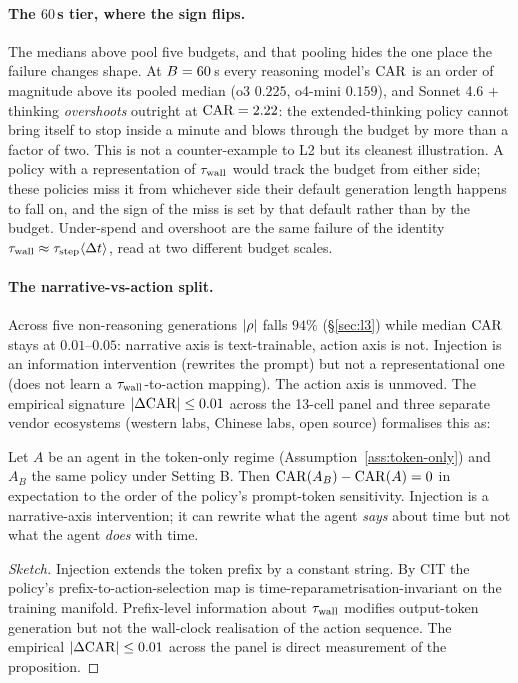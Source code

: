 \paragraph{The $60$\,s tier, where the sign flips.} The medians above pool five budgets, and that pooling hides the one place the failure changes shape. At $B = 60$\,s every reasoning model's $\mathrm{CAR}$ is an order of magnitude above its pooled median (o3 $0.225$, o4-mini $0.159$), and Sonnet 4.6 $+$ thinking \emph{overshoots} outright at $\mathrm{CAR} = 2.22$: the extended-thinking policy cannot bring itself to stop inside a minute and blows through the budget by more than a factor of two. This is not a counter-example to L2 but its cleanest illustration. A policy with a representation of $\tau_{\mathrm{wall}}$ would track the budget from either side; these policies miss it from whichever side their default generation length happens to fall on, and the sign of the miss is set by that default rather than by the budget. Under-spend and overshoot are the same failure of the identity $\tau_{\mathrm{wall}} \approx \tau_{\mathrm{step}}\langle\Delta t\rangle$, read at two different budget scales.

\paragraph{The narrative-vs-action split.}
Across five non-reasoning generations $|\rho|$ falls $94\%$ (\S\ref{sec:l3}) while median $\mathrm{CAR}$ stays at $0.01$--$0.05$: narrative axis is text-trainable, action axis is not. Injection is an information intervention (rewrites the prompt) but not a representational one (does not learn a $\tau_{\mathrm{wall}}$-to-action mapping). The action axis is unmoved. The empirical signature $|\Delta\mathrm{CAR}| \leq 0.01$ across the 13-cell panel and three separate vendor ecosystems (western labs, Chinese labs, open source) formalises this as:

\begin{proposition}
\label{prop:injection-not-action}
Let $A$ be an agent in the token-only regime (Assumption~\ref{ass:token-only}) and $A_B$ the same policy under Setting B. Then $\mathrm{CAR}(A_B) - \mathrm{CAR}(A) = 0$ in expectation to the order of the policy's prompt-token sensitivity. Injection is a narrative-axis intervention; it can rewrite what the agent \emph{says} about time but not what the agent \emph{does} with time.
\end{proposition}

\begin{proof}[Sketch] Injection extends the token prefix by a constant string. By CIT the policy's prefix-to-action-selection map is time-reparametrisation-invariant on the training manifold. Prefix-level information about $\tau_{\mathrm{wall}}$ modifies output-token generation but not the wall-clock realisation of the action sequence. The empirical $|\Delta\mathrm{CAR}| \leq 0.01$ across the panel is direct measurement of the proposition. \end{proof}

